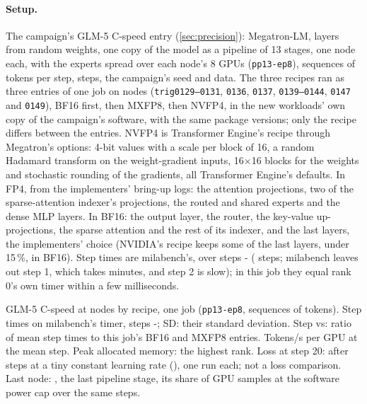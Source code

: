 \paragraph{Setup.} The campaign's GLM-5 C-speed entry (\cref{sec:precision}): Megatron-LM, \TriFpFourLayers{} layers from random weights, one copy of the model as a pipeline of 13 stages, one node each, with the experts spread over each node's 8 GPUs (\texttt{pp13-ep8}), \TriFpFourSeqs{} sequences of \TriFpFourSeqLen{} tokens per step, \TriFpFourSteps{} steps, the campaign's seed and data. The three recipes ran as three entries of one job on \TriFpFourNodes{} nodes (\texttt{trig0129--0131}, \texttt{0136}, \texttt{0137}, \texttt{0139--0144}, \texttt{0147} and \texttt{0149}), BF16 first, then MXFP8, then NVFP4, in the new workloads' own copy of the campaign's software, with the same package versions; only the recipe differs between the entries. NVFP4 is Transformer Engine's recipe through Megatron's options: 4-bit values with a scale per block of 16, a random Hadamard transform on the weight-gradient inputs, 16$\times$16 blocks for the weights and stochastic rounding of the gradients, all Transformer Engine's defaults. In FP4, from the implementers' bring-up logs: the attention projections, two of the sparse-attention indexer's projections, the routed and shared experts and the dense MLP layers. In BF16: the output layer, the router, the key-value up-projections, the sparse attention and the rest of its indexer, and the last \TriFpFourBfLast{} layers, the implementers' choice (NVIDIA's recipe keeps some of the last layers, under 15\,\%, in BF16). Step times are milabench's, over steps \TriFpFourFrom-\TriFpFourSteps{} (\TriFpFourMeasured{} steps; milabench leaves out step 1, which takes minutes, and step 2 is slow); in this job they equal rank 0's own timer within a few milliseconds.

\begin{table}[h]
  \caption{GLM-5 C-speed at \TriFpFourNodes{} nodes by recipe, one job (\texttt{pp13-ep8}, \TriFpFourSeqs{} sequences of \TriFpFourSeqLen{} tokens). Step times on milabench's timer, steps \TriFpFourFrom-\TriFpFourSteps; SD: their standard deviation. Step vs: ratio of mean step times to this job's BF16 and MXFP8 entries. Tokens/s per GPU at the mean step. Peak allocated memory: the highest rank. Loss at step 20: after \TriFpFourSteps{} steps at a tiny constant learning rate (\TriFpFourLr), one run each; not a loss comparison. Last node: \texttt{\TriFpFourLastHost}, the last pipeline stage, its share of GPU samples at the software power cap over the same steps.}
  \label{tab:glm_fp4_runs}
  \centering\small
  \begin{adjustbox}{max width=\linewidth}
  \end{adjustbox}
\end{table}

